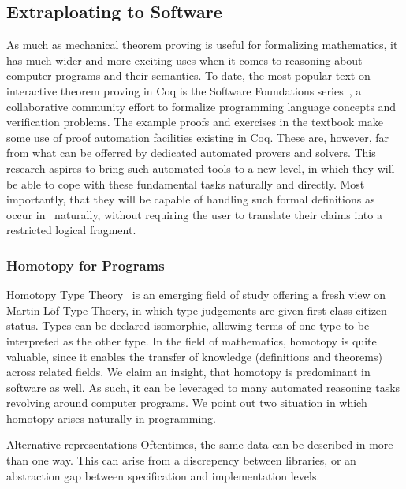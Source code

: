 \subsection{Extraploating to Software}

As much as mechanical theorem proving is useful for formalizing mathematics, it has much wider and more exciting uses when it comes to reasoning about computer programs and their semantics.
To date, the most popular text on interactive theorem proving in Coq is the Software Foundations series~\citeneeded{}, a collaborative community
effort to formalize programming language concepts
and verification problems.
The example proofs and exercises in the textbook make some use of proof automation facilities existing in Coq.
These are, however, far from what can be offerred by dedicated automated provers and solvers.
This research aspires to bring such automated tools to a new level, in which they will be able to cope with these fundamental tasks naturally and directly.
Most importantly, that they will be capable of handling such formal definitions as occur in~ naturally, without requiring the user to translate their claims into a restricted logical fragment.

\subsubsection{Homotopy for Programs}

Homotopy Type Theory~\citeneeded{} is an emerging field of study offering a fresh view on Martin-L\"of  Type Thoery, in which type judgements are given
first-class-citizen status.
Types can be declared isomorphic, allowing terms of one type to be interpreted as the other type.
In the field of mathematics, homotopy is quite valuable, since it enables the transfer of knowledge (definitions and theorems) across related fields.
We claim an insight, that homotopy is predominant in software as well.
As such, it can be leveraged to many automated reasoning tasks revolving around computer programs.
We point out two situation in which homotopy arises naturally in programming.

\begin{paragraph}{Alternative representations}
Oftentimes, the same data can be described in more than one way.
This can arise from a discrepency between libraries, or an abstraction gap between specification and implementation levels.
\end{paragraph}